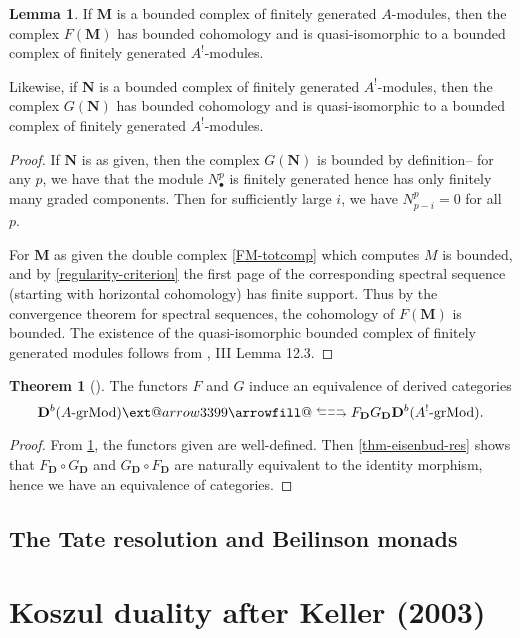 \documentclass[a4paper]{article}
\makeatletter
\theoremstyle{definition}
\newtheorem{theorem}[defn]{Theorem}
\newtheorem{lemma}[defn]{Lemma}
\theoremstyle{remark}
\newcommand{\leftrarrows}{\mathrel{\raise.75ex\hbox{\oalign{%
  $\scriptstyle\leftarrow$\cr
  \vrule width0pt height.5ex$\hfil\scriptstyle\relbar$\cr}}}}
\newcommand{\lrightarrows}{\mathrel{\raise.75ex\hbox{\oalign{%
  $\scriptstyle\relbar$\hfil\cr
  $\scriptstyle\vrule width0pt height.5ex\smash\rightarrow$\cr}}}}
\newcommand{\Rrelbar}{\mathrel{\raise.75ex\hbox{\oalign{%
  $\scriptstyle\relbar$\cr
  \vrule width0pt height.5ex$\scriptstyle\relbar$}}}}
\def\leftrightarrowsfill@{\arrowfill@\leftrarrows\Rrelbar\lrightarrows}
\newcommand{\xleftrightarrows}[2][]{\ext@arrow 3399\leftrightarrowsfill@{#1}{#2}}
\newcommand{\grMod}{\ensuremath{\text{-grMod}}}
\newcommand{\deri}{\mathbf{D}}
\makeatother
\begin{document}
\begin{lemma}\label{derived-image-bounded}
    If \(\mathbf{M}\) is a bounded complex of finitely
    generated \(A\)-modules, then the complex \(F(\mathbf{M})\) has bounded
    cohomology and is quasi-isomorphic to a bounded complex of finitely
    generated \(A^!\)-modules. 

    Likewise, if \(\mathbf{N}\) is a bounded complex of finitely
    generated \(A^!\)-modules, then the complex \(G(\mathbf{N})\) has bounded
    cohomology and is quasi-isomorphic to a bounded complex of finitely
    generated \(A^!\)-modules.
    \begin{proof}
        If \(\mathbf{N}\) is as given, then the complex \(G(\mathbf{N})\) is
        bounded by definition-- for any \(p\), we have that the module
        \(N^p_\bullet\) is finitely generated hence has only finitely many
        graded components. Then for sufficiently large \(i\), we have
        \(N^p_{p-i}=0\) for all \(p\). 

        For \(\mathbf{M}\) as given the double complex \eqref{FM-totcomp} which
        computes \(M\) is bounded, and by \cref{regularity-criterion} the first
        page of the corresponding spectral sequence (starting with horizontal
        cohomology) has finite support. Thus by the convergence theorem for
        spectral sequences, the cohomology of \(F(\mathbf{M})\) is bounded. The
        existence of the quasi-isomorphic bounded complex of finitely generated
        modules follows from , III
        Lemma 12.3.
    \end{proof}
\end{lemma}

\begin{theorem}[]
    The functors \(F\) and \(G\) induce an equivalence of derived categories 
    \[ \deri^b(A\grMod) \xleftrightarrows[F_\deri]{G_\deri} \deri^b(A^!\grMod).\]
    \begin{proof}
        From \cref{derived-image-bounded}, the functors given are well-defined.
        Then \cref{thm-eisenbud-res} shows that \({F_\deri \circ G_\deri}\) and
        \(G_\deri \circ F_\deri\) are naturally equivalent to the identity
        morphism, hence we have an equivalence of categories.
    \end{proof}
\end{theorem}



\subsection{The Tate resolution and Beilinson monads}

\section{Koszul duality after Keller (2003)}\label{sec-keller}


\end{document}
